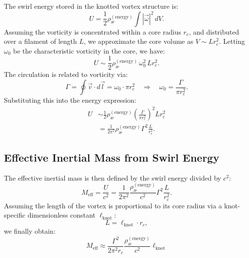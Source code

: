   The swirl energy stored in the knotted vortex structure is:
  \begin{equation}
    U = \frac{1}{2} \rho_\text{\ae}^{(\text{energy})} \int |\vec{\omega}|^2 \, dV.
  \end{equation}
  Assuming the vorticity is concentrated within a core radius $r_c$, and distributed over a filament of length $L$, we approximate the core volume as $V \sim L r_c^2$. Letting $\omega_0$ be the characteristic vorticity in the core, we have:
  \begin{equation}
    U \sim \frac{1}{2} \rho_\text{\ae}^{(\text{energy})} \, \omega_0^2 \, L r_c^2.
  \end{equation}
  The circulation is related to vorticity via:
  \begin{equation}
    \Gamma = \oint \vec{v} \cdot d\vec{l} = \omega_0 \cdot \pi r_c^2 \quad \Rightarrow \quad \omega_0 = \frac{\Gamma}{\pi r_c^2}.
  \end{equation}
  Substituting this into the energy expression:
  \begin{align}
    U &\sim \frac{1}{2} \rho_\text{\ae}^{(\text{energy})} \left( \frac{\Gamma}{\pi r_c^2} \right)^2 L r_c^2 \\
    &= \frac{1}{2\pi^2} \rho_\text{\ae}^{(\text{energy})} \Gamma^2 \frac{L}{r_c^2}.
  \end{align}

  \subsection{Effective Inertial Mass from Swirl Energy}

  The effective inertial mass is then defined by the swirl energy divided by $c^2$:
  \begin{equation}
    M_\text{eff} = \frac{U}{c^2} = \frac{1}{2\pi^2} \frac{\rho_\text{\ae}^{(\text{energy})}}{c^2} \Gamma^2 \frac{L}{r_c^2}.
  \end{equation}
  Assuming the length of the vortex is proportional to its core radius via a knot-specific dimensionless constant $\ell_\text{knot}$:
  \begin{equation}
    L = \ell_\text{knot} \cdot r_c,
  \end{equation}
  we finally obtain:
  \begin{equation}
    \boxed{
      M_\text{eff} \approx \frac{\Gamma^2}{2\pi^2 r_c} \frac{\rho_\text{\ae}^{(\text{energy})}}{c^2} \ell_\text{knot}
    }
  \end{equation}

